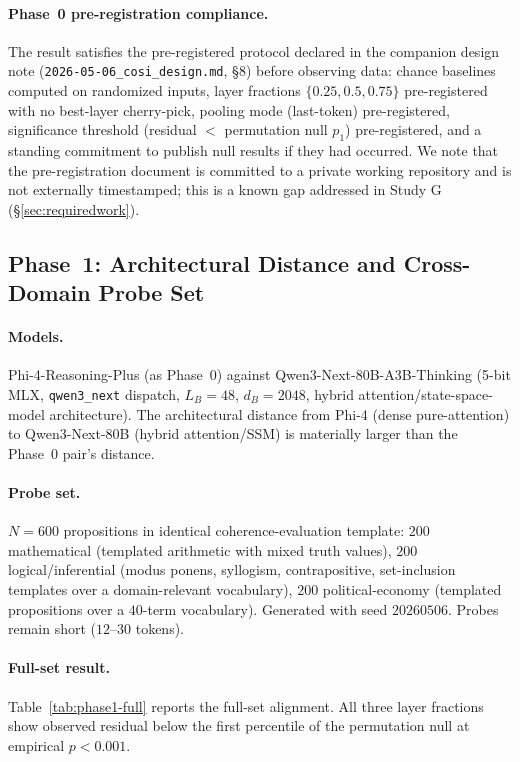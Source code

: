 \paragraph{Phase~0 pre-registration compliance.} The result satisfies
the pre-registered protocol declared in the companion design note
(\texttt{2026-05-06\_cosi\_design.md}, \S8) before observing data:
chance baselines computed on randomized inputs, layer fractions
$\{0.25, 0.5, 0.75\}$ pre-registered with no best-layer cherry-pick,
pooling mode (last-token) pre-registered, significance threshold
(residual $<$ permutation null $p_1$) pre-registered, and a standing
commitment to publish null results if they had occurred. We note that
the pre-registration document is committed to a private working
repository and is not externally timestamped; this is a known gap
addressed in Study G (\S\ref{sec:requiredwork}).

\subsection{Phase~1: Architectural Distance and Cross-Domain Probe Set}
\label{sec:results-phase1}

\paragraph{Models.} Phi-4-Reasoning-Plus (as Phase~0) against
Qwen3-Next-80B-A3B-Thinking (5-bit MLX, \texttt{qwen3\_next} dispatch,
$L_B = 48$, $d_B = 2048$, hybrid attention/state-space-model
architecture). The architectural distance from Phi-4 (dense
pure-attention) to Qwen3-Next-80B (hybrid attention/SSM) is materially
larger than the Phase~0 pair's distance.

\paragraph{Probe set.} $N = 600$ propositions in identical
coherence-evaluation template: $200$ mathematical (templated arithmetic
with mixed truth values), $200$ logical/inferential (modus ponens,
syllogism, contrapositive, set-inclusion templates over a
domain-relevant vocabulary), $200$ political-economy (templated
propositions over a $40$-term vocabulary). Generated with seed
$20260506$. Probes remain short ($12$--$30$ tokens).

\paragraph{Full-set result.} Table~\ref{tab:phase1-full} reports the
full-set alignment. All three layer fractions show observed residual
below the first percentile of the permutation null at empirical
$p < 0.001$.

